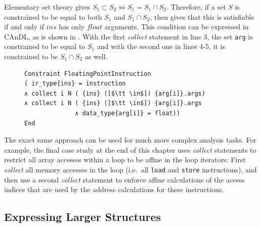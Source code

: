    Elementary set theory gives  $S_1\subset S_2\iff S_1 = S_1\cap S_2$.
    Therefore, if a set $S$ is constrained to be equal to both $S_1$ and
    $S_1\cap S_2$, then  gives that this is satisfiable if
    and only if $ins$ has only $float$ arguments.
    This condition can be expressed in CAnDL, as is shown in
    .
    With the first {\it collect} statement in line 3, the set \texttt{arg} is
    constrained to be equal to $S_1$ and with the second one in lines 4-5, it
    is constrained to be $S_1\cap S_2$ as well.

\begin{figure}[H]
\begin{lstlisting}[language=CAnDL,label={fig:collectexample},caption=
   {{\it Collect} is used to restrict {\tt ins} to be calculated exclusively
    from floating point values.\leftskip=0pt\rightskip=0pt}]
Constraint FloatingPointInstruction
( ir_type{ins} = instruction
∧ collect i N ( {ins} ([$\tt \in$]) {arg[i]}.args)
∧ collect i N ( {ins} ([$\tt \in$]) {arg[i]}.args
              ∧ data_type{arg[i]} = float))
End
\end{lstlisting}
\end{figure}

    The exact same approach can be used for much more complex analysis tasks.
    For example, the final case study at the end of this chapter uses
    {\it collect} statements to restrict all array accesses within a
    loop to be affine in the loop iterators:
    First {\it collect} all memory accesses in the loop
    (i.e.\ all \texttt{load} and \texttt{store} instructions), and then use a
    second {\it collect} statement to enforce affine calculations of the access
    indices that are used by the address calculations for these instructions.

\subsection{Expressing Larger Structures}

